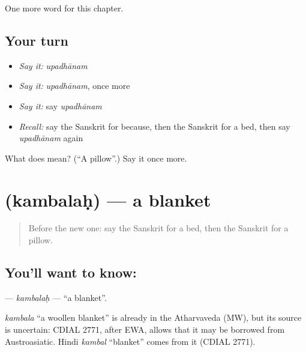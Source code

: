 \begin{grammarlens}[title={What you've built}]
One more word for this chapter.
\end{grammarlens}

\subsection*{Your turn}
\begin{itemize}
\raggedright
  \item \emph{Say it:} \emph{upadhānam}
  \item \emph{Say it:} \emph{upadhānam}, once more
  \item \emph{Say it:} say \emph{upadhānam}
  \item \emph{Recall:} say the Sanskrit for because, then the Sanskrit for a bed, then say \emph{upadhānam} again
\end{itemize}

\begin{tcolorbox}[breakable,colback=teal!4,colframe=teal!35!black,title={Before you move on}]
What does  mean? (\textquotedblleft{}A pillow\textquotedblright{}.) Say it once more.
\end{tcolorbox}
\section[\texorpdfstring{\sk{कम्बलः} (kambalaḥ)}{कम्बलः (kambalaḥ)}]{ (kambalaḥ) — a blanket}

\label{lesson:SA-C99-kambalah}



\begin{quote}
Before the new one: say the Sanskrit for a bed, then the Sanskrit for a pillow.
\end{quote}

\subsection*{You'll want to know: }
\textbf{} — \emph{kambalaḥ} — \textquotedblleft{}a blanket\textquotedblright{}.

\begin{cousinweb}
\emph{kambala} \textquotedblleft{}a woollen blanket\textquotedblright{} is already in the Atharvaveda (MW), but its source is uncertain: CDIAL 2771, after EWA, allows that it may be borrowed from Austroasiatic. Hindi \emph{kambal} \textquotedblleft{}blanket\textquotedblright{} comes from it (CDIAL 2771).
\end{cousinweb}

